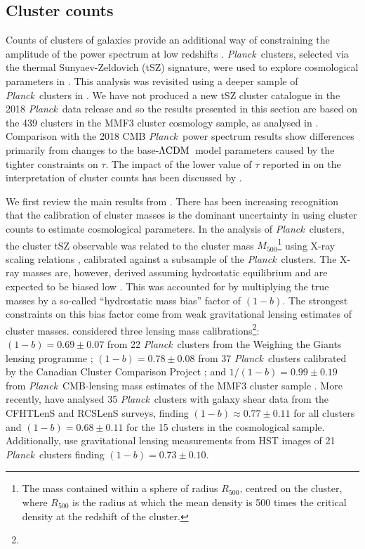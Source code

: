 \documentclass[longauth,traditabstract]{aa}
\def\Planck{\textit{Planck}}
\providecommand{\LCDM}{{$\rm{\Lambda CDM}$}}
\begin{document}
\subsection{Cluster counts}
\label{sec:clusters}

Counts of clusters of galaxies provide an additional way of constraining the
amplitude of the power spectrum at low redshifts \citep[e.g.,][and references therein]
{Pierpaoli:2001,Komatsu:2002}.  \Planck\ clusters, selected via the thermal
Sunyaev-Zeldovich (tSZ) signature, were used to explore  cosmological parameters
in \cite{planck2013-p15}. This analysis was revisited using a deeper
sample of \Planck\ clusters in \cite{planck2014-a30}. We have not produced a new tSZ
cluster catalogue in the 2018 \Planck\ data release and so the results presented
in this section are based on the 439 clusters in the MMF3 cluster cosmology sample,
as analysed in \cite{planck2014-a30}.
 Comparison with the 2018 CMB \Planck\ power
spectrum results show differences primarily from changes to the base-\LCDM\ model
parameters caused by the tighter constraints on $\tau$. The impact of the lower value
of $\tau$ reported in \cite{planck2014-a10} on the interpretation of cluster counts
has been discussed by \cite{Salvati:2017rsn}.

We first review the main results from \cite{planck2014-a30}.
There has been increasing recognition that the calibration of cluster masses is the dominant uncertainty in
using cluster counts to estimate cosmological parameters. In the analysis of \Planck\
clusters, the cluster tSZ observable
was related to the cluster mass $M_{500}$\footnote{The mass contained
 within a sphere of radius $R_{500}$, centred on the cluster, where
 $R_{500}$ is the radius at which the mean density is 500 times the
 critical density at the redshift of the cluster.} using X-ray
scaling relations \citep{Arnaud:2010}, calibrated against a subsample
of the \Planck\ clusters. The X-ray masses are, however, derived
assuming hydrostatic equilibrium and are expected to be biased low
\citep[e.g.,][]{Nagai:2007}. This was accounted for by multiplying the
true masses by a so-called ``hydrostatic mass bias'' factor of $(1-b)$.
The strongest constraints on
this bias factor come from weak gravitational lensing estimates of
cluster masses. \citet{planck2014-a30} considered three lensing mass calibrations\footnote{}:
$(1-b) = 0.69 \pm 0.07$ from 22 \Planck\ clusters from the Weighing the Giants lensing
programme \citep{vonderLinden:14}; $(1-b) = 0.78 \pm 0.08$ from 37 \Planck\ clusters
calibrated by the Canadian Cluster Comparison Project \citep{Hoekstra:15}; and
$1/(1-b) = 0.99 \pm 0.19$ from \Planck\ CMB-lensing mass estimates of the MMF3
cluster sample \citep{planck2014-a30}. More recently, \citet{Sereno:2017zcn} have analysed 35 \Planck\ clusters with galaxy shear data from the CFHTLenS \citep{Heymans:2012} and RCSLenS \citep{Hildebrandt:2016} surveys, finding $(1-b) \approx 0.77 \pm 0.11$ for all clusters and $(1-b) = 0.68 \pm 0.11$ for the 15 clusters in the cosmological sample. Additionally, \citet{Penna-Lima:2016tvo}
use gravitational lensing measurements from HST images of 21 \Planck\ clusters finding $(1-b)=0.73 \pm 0.10$.
\end{document}
